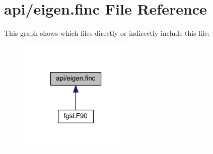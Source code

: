 \hypertarget{eigen_8finc}{\section{api/eigen.finc File Reference}
\label{eigen_8finc}
}
This graph shows which files directly or indirectly include this file\-:
\nopagebreak
\begin{figure}[H]
\begin{center}
\leavevmode
\includegraphics[width=154pt]{eigen_8finc__dep__incl}
\end{center}
\end{figure}

